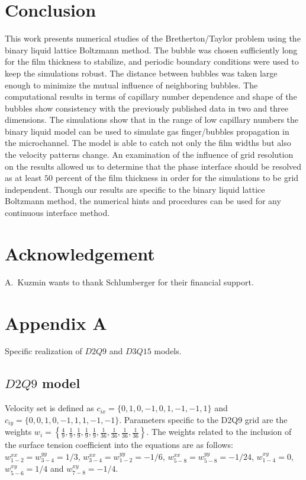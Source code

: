 \documentclass{CFD2011}
\begin{document}
\section{Conclusion}
This work presents numerical studies of the
Bretherton/Taylor problem using the binary liquid lattice Boltzmann method. The bubble was chosen
sufficiently long for the film
thickness to
stabilize, and periodic boundary conditions were used to keep the simulations robust. The
distance between bubbles was taken large enough to minimize
the mutual influence of neighboring bubbles. The computational
results in terms of capillary number dependence and shape of the bubbles show consistency with the
previously published data in two and three dimensions. The simulations show that in the range of low
capillary numbers the binary liquid model can be used to
simulate gas finger/bubbles propagation in the microchannel. The model is able to catch not only
the film widths but also the velocity patterns change. 
 An examination of the influence of grid resolution on the
results allowed
us to determine that the phase interface should be resolved as at least $50$ percent of the film
thickness
in order for the simulations to be grid independent. Though our results are specific to the binary
liquid lattice
Boltzmann method, the numerical hints and procedures can be used for any
continuous interface method. 

\section{Acknowledgement}
A.~Kuzmin wants to thank Schlumberger for their financial support.


%   

\section{Appendix A}
\label{app:models}
Specific realization of $D2Q9$ and $D3Q15$ models.
\subsection{$D2Q9$ model}
Velocity set is defined as $c_{ix}=\{0,1,0,-1,0,1,-1,-1,1\}$ and $c_{iy}=\{0,0,1,0,-1,1,1,-1,-1\}$.
Parameters specific to the D2Q9 grid are the weights
$w_i=\left\{\frac{4}{9},\frac{1}{9},\frac{1}{9},\frac{1}{9},\frac{1}{9},
\frac{1}{36},\frac{1}{36},\frac{1}{36},\frac{1}{36}\right\}$.  The weights related to the
inclusion of the surface tension coefficient into the equations are as follows:
$w^{xx}_{1-2}=w^{yy}_{3-4}=1/3$, $w^{xx}_{3-4}=w^{yy}_{1-2}=-1/6$,
$w^{xx}_{5-8}=w^{yy}_{5-8}=-1/24$, $w^{xy}_{1-4}=0$, $w^{xy}_{5-6}=1/4$ and
$w^{xy}_{7-8}=-1/4$.
\end{document}
